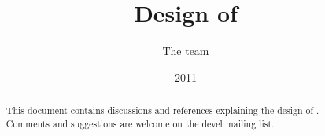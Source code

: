 \documentclass[a4paper,11pt]{article}
\title{Design of \sofa}
\author{The \sofa{} team}
\date{2011}
\begin{document}
 
\maketitle

\begin{abstract}
This document contains discussions and references explaining the design of \sofa{}.
Comments and suggestions are welcome on the \sofa{} devel mailing list.
\end{abstract}


\end{document}
